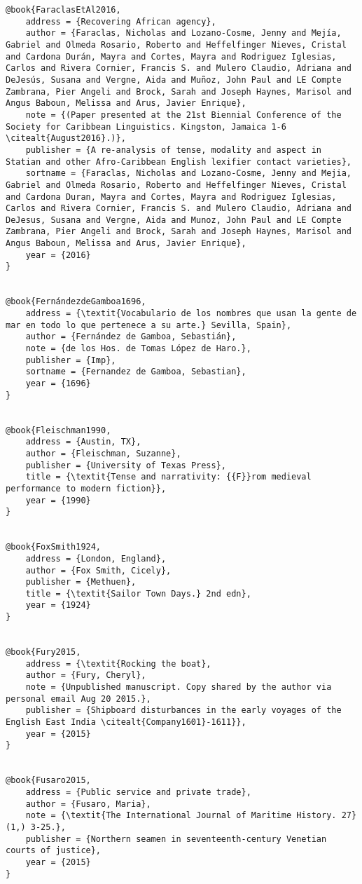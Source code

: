 \begin{verbatim}
@book{FaraclasEtAl2016,
	address = {Recovering African agency},
	author = {Faraclas, Nicholas and Lozano-Cosme, Jenny and Mejía, Gabriel and Olmeda Rosario, Roberto and Heffelfinger Nieves, Cristal and Cardona Durán, Mayra and Cortes, Mayra and Rodriguez Iglesias, Carlos and Rivera Cornier, Francis S. and Mulero Claudio, Adriana and DeJesús, Susana and Vergne, Aida and Muñoz, John Paul and LE Compte Zambrana, Pier Angeli and Brock, Sarah and Joseph Haynes, Marisol and Angus Baboun, Melissa and Arus, Javier Enrique},
	note = {(Paper presented at the 21st Biennial Conference of the Society for Caribbean Linguistics. Kingston, Jamaica 1-6 \citealt{August2016}.)},
	publisher = {A re-analysis of tense, modality and aspect in Statian and other Afro-Caribbean English lexifier contact varieties},
	sortname = {Faraclas, Nicholas and Lozano-Cosme, Jenny and Mejia, Gabriel and Olmeda Rosario, Roberto and Heffelfinger Nieves, Cristal and Cardona Duran, Mayra and Cortes, Mayra and Rodriguez Iglesias, Carlos and Rivera Cornier, Francis S. and Mulero Claudio, Adriana and DeJesus, Susana and Vergne, Aida and Munoz, John Paul and LE Compte Zambrana, Pier Angeli and Brock, Sarah and Joseph Haynes, Marisol and Angus Baboun, Melissa and Arus, Javier Enrique},
	year = {2016}
}


@book{FernándezdeGamboa1696,
	address = {\textit{Vocabulario de los nombres que usan la gente de mar en todo lo que pertenece a su arte.} Sevilla, Spain},
	author = {Fernández de Gamboa, Sebastián},
	note = {de los Hos. de Tomas López de Haro.},
	publisher = {Imp},
	sortname = {Fernandez de Gamboa, Sebastian},
	year = {1696}
}


@book{Fleischman1990,
	address = {Austin, TX},
	author = {Fleischman, Suzanne},
	publisher = {University of Texas Press},
	title = {\textit{Tense and narrativity: {{F}}rom medieval performance to modern fiction}},
	year = {1990}
}


@book{FoxSmith1924,
	address = {London, England},
	author = {Fox Smith, Cicely},
	publisher = {Methuen},
	title = {\textit{Sailor Town Days.} 2nd edn},
	year = {1924}
}


@book{Fury2015,
	address = {\textit{Rocking the boat},
	author = {Fury, Cheryl},
	note = {Unpublished manuscript. Copy shared by the author via personal email Aug 20 2015.},
	publisher = {Shipboard disturbances in the early voyages of the English East India \citealt{Company1601}-1611}},
	year = {2015}
}


@book{Fusaro2015,
	address = {Public service and private trade},
	author = {Fusaro, Maria},
	note = {\textit{The International Journal of Maritime History. 27}(1,) 3-25.},
	publisher = {Northern seamen in seventeenth-century Venetian courts of justice},
	year = {2015}
}



\end{verbatim}
